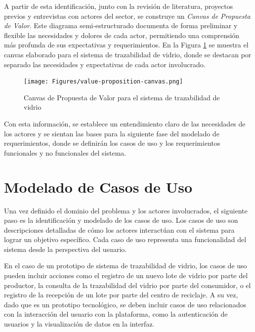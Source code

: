 
A partir de esta identificación, junto con la revisión de literatura, proyectos previos y entrevistas con actores del sector, se construye un \textit{Canvas de Propuesta de Valor}. Este diagrama semi-estructurado documenta de forma preliminar y flexible las necesidades y dolores de cada actor, permitiendo una comprensión más profunda de sus expectativas y requerimientos. En la Figura \ref{fig:value-proposition-canvas} se muestra el canvas elaborado para el sistema de trazabilidad de vidrio, donde se destacan por separado las necesidades y expectativas de cada actor involucrado.

\begin{figure}[!htpb]
		\centering
		\texttt{[image: Figures/value-proposition-canvas.png]}
		\caption{Canvas de Propuesta de Valor para el sistema de trazabilidad de vidrio}
		\label{fig:value-proposition-canvas}
\end{figure}

Con esta información, se establece un entendimiento claro de las necesidades de los actores y se sientan las bases para la siguiente fase del modelado de requerimientos, donde se definirán los casos de uso y los requerimientos funcionales y no funcionales del sistema.

\section{Modelado de Casos de Uso}
\label{sec:use-cases}

Una vez definido el dominio del problema y los actores involucrados, el siguiente paso es la identificación y modelado de los casos de uso. Los casos de uso son descripciones detalladas de cómo los actores interactúan con el sistema para lograr un objetivo específico. Cada caso de uso representa una funcionalidad del sistema desde la perspectiva del usuario.

En el caso de un prototipo de sistema de trazabilidad de vidrio, los casos de uso pueden incluir acciones como el registro de un nuevo lote de vidrio por parte del productor, la consulta de la trazabilidad del vidrio por parte del consumidor, o el registro de la recepción de un lote por parte del centro de reciclaje. A su vez, dado que es un prototipo tecnológico, se deben incluir casos de uso relacionados con la interacción del usuario con la plataforma, como la autenticación de usuarios y la visualización de datos en la interfaz.

